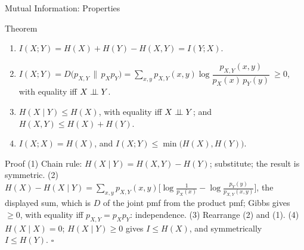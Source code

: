 \begin{frame}{Mutual Information: Properties}
  \small
  \begin{block}{Theorem}
    \begin{enumerate}
      \item $I(X;Y)=H(X)+H(Y)-H(X,Y)=I(Y;X)$.
      \item $I(X;Y)=D\big(p_{X,Y}\,\|\,p_Xp_Y\big)=\sum_{x,y}p_{X,Y}(x,y)\log\dfrac{p_{X,Y}(x,y)}{p_X(x)\,p_Y(y)}\ \ge0$, with equality iff $X\perp\!\!\!\perp Y$.
      \item $H(X\mid Y)\le H(X)$, with equality iff $X\perp\!\!\!\perp Y$; and $H(X,Y)\le H(X)+H(Y)$.
      \item $I(X;X)=H(X)$, and $I(X;Y)\le\min\big(H(X),H(Y)\big)$.
    \end{enumerate}
  \end{block}
  \begin{block}{Proof}
    (1) Chain rule: $H(X\mid Y)=H(X,Y)-H(Y)$; substitute; the result is symmetric.
    (2) $H(X)-H(X\mid Y)=\sum_{x,y}p_{X,Y}(x,y)\big[\log\frac1{p_X(x)}-\log\frac{p_Y(y)}{p_{X,Y}(x,y)}\big]$, the displayed sum, which is $D$ of the joint pmf from the product pmf; Gibbs gives $\ge0$, with equality iff $p_{X,Y}=p_Xp_Y$: independence.
    (3) Rearrange (2) and (1). (4) $H(X\mid X)=0$; $H(X\mid Y)\ge0$ gives $I\le H(X)$, and symmetrically $I\le H(Y)$. \hfill$\square$
  \end{block}
\end{frame}

